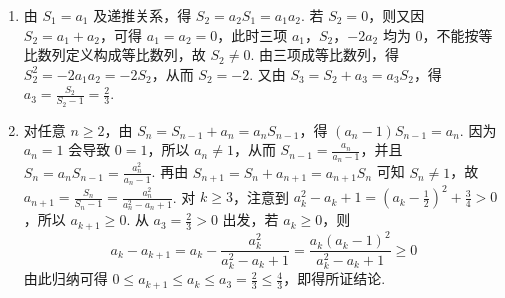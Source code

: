 \begin{solution}
\begin{enumerate}
\item 由 \(S_1=a_1\) 及递推关系，得 \(S_2=a_2S_1=a_1a_2\). 若 \(S_2=0\)，则又因 \(S_2=a_1+a_2\)，可得 \(a_1=a_2=0\)，此时三项 \(a_1\)，\(S_2\)，\(-2a_2\) 均为 \(0\)，不能按等比数列定义构成等比数列，故 \(S_2\ne0\). 由三项成等比数列，得 \(S_2^2=-2a_1a_2=-2S_2\)，从而 \(S_2=-2\). 又由 \(S_3=S_2+a_3=a_3S_2\)，得 \(a_3=\frac{S_2}{S_2-1}=\frac{2}{3}\).
\item 对任意 \(n\geqslant2\)，由 \(S_n=S_{n-1}+a_n=a_nS_{n-1}\)，得 \((a_n-1)S_{n-1}=a_n\). 因为 \(a_n=1\) 会导致 \(0=1\)，所以 \(a_n\ne1\)，从而 \(S_{n-1}=\frac{a_n}{a_n-1}\)，并且 \(S_n=a_nS_{n-1}=\frac{a_n^2}{a_n-1}\). 再由 \(S_{n+1}=S_n+a_{n+1}=a_{n+1}S_n\) 可知 \(S_n\ne1\)，故 \(a_{n+1}=\frac{S_n}{S_n-1}=\frac{a_n^2}{a_n^2-a_n+1}\). 对 \(k\geqslant3\)，注意到 \(a_k^2-a_k+1=\left(a_k-\frac{1}{2}\right)^2+\frac{3}{4}>0\)，所以 \(a_{k+1}\geqslant0\). 从 \(a_3=\frac{2}{3}>0\) 出发，若 \(a_k\geqslant0\)，则
\[
a_k-a_{k+1}=a_k-\frac{a_k^2}{a_k^2-a_k+1}=\frac{a_k(a_k-1)^2}{a_k^2-a_k+1}\geqslant0
\]
由此归纳可得 \(0\leqslant a_{k+1}\leqslant a_k\leqslant a_3=\frac{2}{3}\leqslant\frac{4}{3}\)，即得所证结论.
\end{enumerate}
\end{solution}
